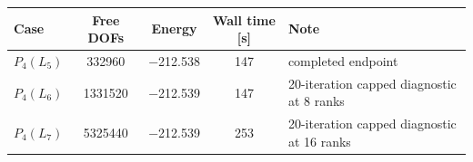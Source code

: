\begin{tabular}{@{}l c c c l@{}}
\toprule
Case & Free DOFs & Energy & Wall time [s] & Note \\
\midrule
$P_{4}(L_{5})$ & \num{332960} & \num{-212.538} & \num{147} & completed endpoint \\
$P_{4}(L_{6})$ & \num{1331520} & \num{-212.539} & \num{147} & 20-iteration capped diagnostic at 8 ranks \\
$P_{4}(L_{7})$ & \num{5325440} & \num{-212.539} & \num{253} & 20-iteration capped diagnostic at 16 ranks \\
\bottomrule
\end{tabular}
